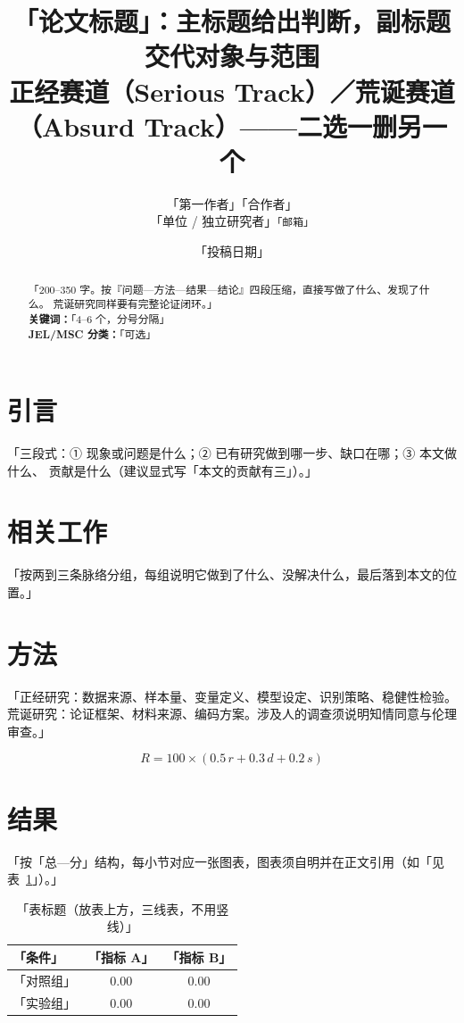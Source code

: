 \documentclass[12pt,a4paper]{article}
\title{\textbf{「论文标题」：主标题给出判断，副标题交代对象与范围}\\
{\large 正经赛道（Serious Track）／荒诞赛道（Absurd Track）——二选一删另一个}}
\author{「第一作者」\quad 「合作者」\\
{\small 「单位 / 独立研究者」\quad \texttt{「邮箱」}}}
\date{「投稿日期」}
\begin{document}
\maketitle

\begin{abstract}
「200--350 字。按『问题---方法---结果---结论』四段压缩，直接写做了什么、发现了什么。
荒诞研究同样要有完整论证闭环。」\\[0.8em]
\textbf{关键词：}「4--6 个，分号分隔」\\
\textbf{JEL/MSC 分类：}「可选」
\end{abstract}

\section{引言}
「三段式：① 现象或问题是什么；② 已有研究做到哪一步、缺口在哪；③ 本文做什么、
贡献是什么（建议显式写「本文的贡献有三」）。」

\section{相关工作}
「按两到三条脉络分组，每组说明它做到了什么、没解决什么，最后落到本文的位置。」

\section{方法}
「正经研究：数据来源、样本量、变量定义、模型设定、识别策略、稳健性检验。
荒诞研究：论证框架、材料来源、编码方案。涉及人的调查须说明知情同意与伦理审查。」

\begin{equation}
R = 100 \times \left( 0.5\,r + 0.3\,d + 0.2\,s \right)
\label{eq:index}
\end{equation}

\section{结果}
「按「总—分」结构，每小节对应一张图表，图表须自明并在正文引用（如「见表~\ref{tab:demo}」）。」

\begin{table}[htbp]
\centering
\caption{「表标题（放表上方，三线表，不用竖线）」}
\label{tab:demo}
\begin{tabular}{lcc}
\toprule
「条件」 & 「指标 A」 & 「指标 B」 \\
\midrule
「对照组」 & 0.00 & 0.00 \\
「实验组」 & 0.00 & 0.00 \\
\bottomrule
\end{tabular}
\end{table}
\end{document}
